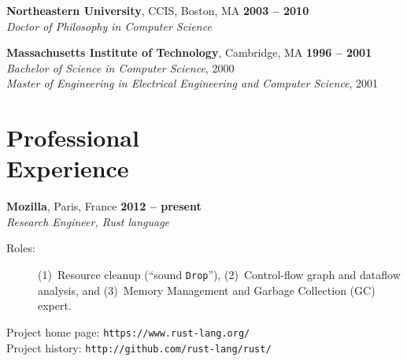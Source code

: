 \documentclass[margin,line,draft]{res}
\def\noneed#1{}
\def\coursetitle#1{\textsl{#1}}
\newcommand{\mysidestyle}{\sc}
\begin{document}
\begin{resume}
    \textbf{Northeastern University}, CCIS, Boston, MA \hfill \textbf{ 2003 -- 2010}\\%
    \textsl{Doctor of Philosophy in Computer Science} \vspace{-2mm}\\\vspace{-2mm}%

    \textbf{Massachusetts Institute of Technology}, Cambridge, MA \hfill \textbf{1996 --  2001}\\%
    \textsl{Bachelor of Science in Computer Science}, 2000 \\\vspace{-2mm}%
    \textsl{Master of Engineering in Electrical Engineering and Computer Science}, 2001 \vspace{-2mm}\\%
     \noneed{\vspace{-4mm}Received letters of commendation for performance in 
     two courses: 
     6.004: \coursetitle{Computation Structures}, and 
     6.170: \coursetitle{Laboratory in Software Engineering}.}

    \section{\mysidestyle Professional\\Experience}

    \textbf{Mozilla}, Paris, France \hfill \textbf{2012 -- present}\\\vspace{1mm}%
    \textsl{Research Engineer, Rust language}
\begin{description}
\item[\rm Roles:] 
  (1)~Resource cleanup (``sound {\tt Drop}''),
  (2)~Control-flow graph and dataflow analysis,
  and
  (3)~Memory Management and Garbage Collection (GC) expert.
\end{description}
    \vspace{-2mm}
    Project home page: {\tt https://www.rust-lang.org/} \\
    Project history: {\tt http://github.com/rust-lang/rust/}


\end{resume}
\end{document}
